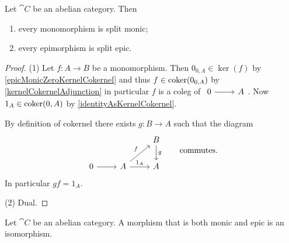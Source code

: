 \begin{proposition}
Let $\cat{C}$ be an abelian category. Then
\begin{enumerate}
\item every monomorphism is split monic;
\item every epimorphism is split epic.
\end{enumerate}
\end{proposition}
\begin{proof}
(1) Let $f: A\to B$ be a monomorphism. Then $0_{0,A}\in\ker(f)$ by \ref{epicMonicZeroKernelCokernel} and thus $f\in \operatorname{coker}(0_{0,A})$ by \ref{kernelCokernelAdjunction} in particular $f$ is a coleg of $\begin{tikzcd}
0 \arrow[r] & A
\end{tikzcd}$. Now $1_A\in\operatorname{coker}(0,A)$ by \ref{identityAsKernelCokernel}.

By definition of cokernel there exists $g: B\to A$ such that the diagram
\[ \begin{tikzcd}
&& B \arrow[d, "g"] \\
0 \arrow[r] & A \arrow[r, "{1_A}"] \arrow[ur, "f"] & A
\end{tikzcd}\qquad\text{commutes.} \]
In particular $gf = 1_A$.

(2) Dual.
\end{proof}
\begin{corollary}
Let $\cat{C}$ be an abelian category. A morphism that is both monic and epic is an isomorphism.
\end{corollary}



